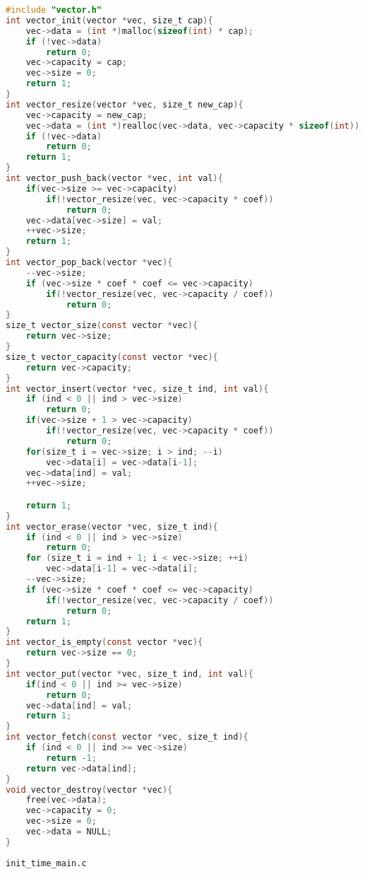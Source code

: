 \documentclass[12pt]{article}
\begin{document}
\begin{lstlisting}[language=C, basicstyle=\scriptsize]
#include "vector.h"
int vector_init(vector *vec, size_t cap){
    vec->data = (int *)malloc(sizeof(int) * cap);
    if (!vec->data) 
        return 0;
    vec->capacity = cap;
    vec->size = 0;
    return 1;
}
int vector_resize(vector *vec, size_t new_cap){
    vec->capacity = new_cap;
    vec->data = (int *)realloc(vec->data, vec->capacity * sizeof(int));
    if (!vec->data)
        return 0;
    return 1;
}
int vector_push_back(vector *vec, int val){
    if(vec->size >= vec->capacity)
        if(!vector_resize(vec, vec->capacity * coef))
            return 0;
    vec->data[vec->size] = val;
    ++vec->size;
    return 1;
}
int vector_pop_back(vector *vec){
    --vec->size;
    if (vec->size * coef * coef <= vec->capacity)
        if(!vector_resize(vec, vec->capacity / coef))
            return 0;
}
size_t vector_size(const vector *vec){
    return vec->size;
}
size_t vector_capacity(const vector *vec){
    return vec->capacity;
}
int vector_insert(vector *vec, size_t ind, int val){
    if (ind < 0 || ind > vec->size)
        return 0;
    if(vec->size + 1 > vec->capacity)
        if(!vector_resize(vec, vec->capacity * coef))
            return 0;
    for(size_t i = vec->size; i > ind; --i)
        vec->data[i] = vec->data[i-1];
    vec->data[ind] = val;
    ++vec->size;

    return 1;
}
int vector_erase(vector *vec, size_t ind){
    if (ind < 0 || ind > vec->size)
        return 0;
    for (size_t i = ind + 1; i < vec->size; ++i)
        vec->data[i-1] = vec->data[i];
    --vec->size;
    if (vec->size * coef * coef <= vec->capacity)
        if(!vector_resize(vec, vec->capacity / coef))
            return 0;
    return 1;
}
int vector_is_empty(const vector *vec){
    return vec->size == 0;
}
int vector_put(vector *vec, size_t ind, int val){
    if(ind < 0 || ind >= vec->size)
        return 0;
    vec->data[ind] = val;
    return 1;
}
int vector_fetch(const vector *vec, size_t ind){
    if (ind < 0 || ind >= vec->size)
        return -1;
    return vec->data[ind];
}
void vector_destroy(vector *vec){
    free(vec->data);
    vec->capacity = 0;
    vec->size = 0;
    vec->data = NULL;
}
\end{lstlisting}
\verb|init_time_main.c|
\end{document}
